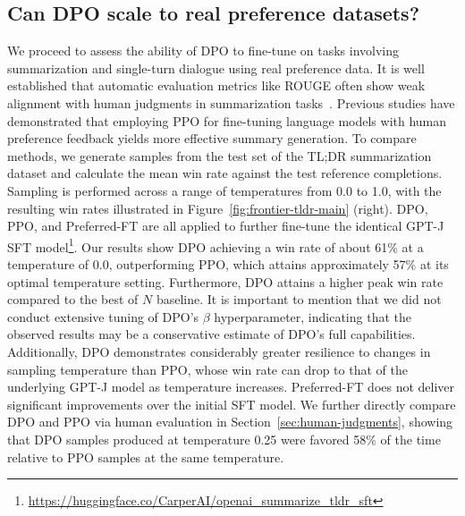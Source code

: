 \subsection{Can DPO scale to real preference datasets?}
\label{sec:dpo-real-datasets}
We proceed to assess the ability of DPO to fine-tune on tasks involving summarization and single-turn dialogue using real preference data. It is well established that automatic evaluation metrics like ROUGE often show weak alignment with human judgments in summarization tasks~\citep{stiennon2022learning}. Previous studies have demonstrated that employing PPO for fine-tuning language models with human preference feedback yields more effective summary generation. To compare methods, we generate samples from the test set of the TL;DR summarization dataset and calculate the mean win rate against the test reference completions. Sampling is performed across a range of temperatures from 0.0 to 1.0, with the resulting win rates illustrated in Figure~\ref{fig:frontier-tldr-main} (right). DPO, PPO, and Preferred-FT are all applied to further fine-tune the identical GPT-J SFT model\footnote{\url{https://huggingface.co/CarperAI/openai_summarize_tldr_sft}}. Our results show DPO achieving a win rate of about 61\% at a temperature of 0.0, outperforming PPO, which attains approximately 57\% at its optimal temperature setting. Furthermore, DPO attains a higher peak win rate compared to the best of $N$ baseline. It is important to mention that we did not conduct extensive tuning of DPO’s $\beta$ hyperparameter, indicating that the observed results may be a conservative estimate of DPO’s full capabilities. Additionally, DPO demonstrates considerably greater resilience to changes in sampling temperature than PPO, whose win rate can drop to that of the underlying GPT-J model as temperature increases. Preferred-FT does not deliver significant improvements over the initial SFT model. We further directly compare DPO and PPO via human evaluation in Section~\ref{sec:human-judgments}, showing that DPO samples produced at temperature 0.25 were favored 58\% of the time relative to PPO samples at the same temperature.

